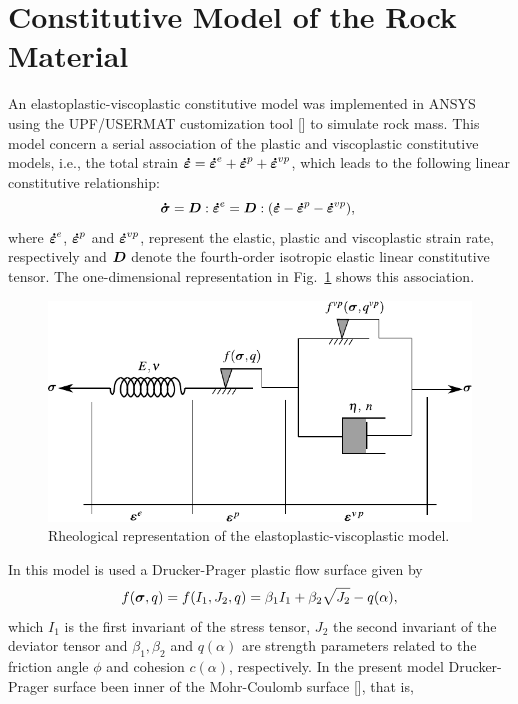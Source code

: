 \documentclass[a4paper,fleqn]{cas-sc}
\begin{document}
\section{Constitutive Model of the Rock Material}\label{}

An elastoplastic-viscoplastic constitutive model was implemented in ANSYS using the UPF/USERMAT customization tool [] to simulate rock mass.  This model concern a serial association of the plastic and viscoplastic constitutive models, i.e., the total strain $\boldsymbol{\dot{\varepsilon}} = \boldsymbol{\dot{\varepsilon}}^{e} + \boldsymbol{\dot{\varepsilon}}^{p} + \boldsymbol{\dot{\varepsilon}}^{vp}$, which leads to the following linear constitutive relationship:
\begin{equation} \label{eq_constitutive_relationship_epvp}
	\boldsymbol{\dot{\sigma}} = \boldsymbol{D} : \boldsymbol{\dot{\varepsilon}}^{e} = \boldsymbol{D} : (\boldsymbol{\dot{\varepsilon}} - \boldsymbol{\dot{\varepsilon}}^{p} - \boldsymbol{\dot{\varepsilon}}^{vp}),\;
\end{equation}
where $\boldsymbol{\dot{\varepsilon}}^{e}$, $\boldsymbol{\dot{\varepsilon}}^{p}$ and $\boldsymbol{\dot{\varepsilon}}^{vp}$, represent the elastic, plastic and viscoplastic strain rate, respectively and $\boldsymbol{D}$ denote the fourth-order isotropic elastic linear constitutive tensor. The one-dimensional representation in Fig.~\ref{reological_scheme} shows this association. 
\begin{figure}[h!]
	\centering
	\includegraphics[scale=1]{Rheological representation.pdf}
	\caption{Rheological representation of the elastoplastic-viscoplastic model.}
	\label{reological_scheme}
\end{figure}
In this model is used a Drucker-Prager plastic flow surface given by
\begin{equation}
	\label{eq:f_Drucker_Prager}
	f(\boldsymbol{\sigma},q) = f(I_1,J_2,q) = \beta_1 I_1 +\beta_2 \sqrt{J_2}-q(\alpha),
\end{equation}
which $I_1$ is the first invariant of the stress tensor, $J_2$ the second invariant of the deviator tensor and $\beta_1, \beta_2$ and $q(\alpha)$ are strength parameters related to the friction angle $\phi$ and cohesion $c(\alpha)$, respectively. In the present model Drucker-Prager surface been inner of the Mohr-Coulomb surface [], that is,
\end{document}
